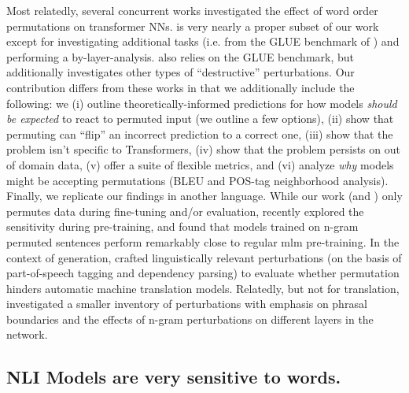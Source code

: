 \documentclass[letterpaper, 12pt]{report}
\begin{document}
Most relatedly, several concurrent works \citep{pham-etal-2020-out, alleman2021syntactic, gupta-etal-2021-bert, sinha2021masked,parthasarathi2021sometimes} investigated the effect of word order permutations on transformer NNs.  \cite{pham-etal-2020-out} is very nearly a proper subset of our work except for investigating additional tasks (i.e. from the GLUE benchmark of \citealt{wang-etal-2018-glue}) and performing a by-layer-analysis. \cite{gupta-etal-2021-bert} also relies on the GLUE benchmark, but additionally investigates other types of ``destructive'' perturbations. Our contribution differs from these works %
in that we additionally include the following: we (i) outline theoretically-informed predictions for how models \emph{should be expected} to react to permuted input (we outline a few options), (ii) show that permuting can ``flip'' an incorrect prediction to a correct one, (iii) show that the problem isn't specific to Transformers, (iv) show that the problem persists on out of domain data, (v) offer a suite of flexible metrics, and (vi) analyze \emph{why} models might be accepting permutations (BLEU and POS-tag neighborhood analysis). Finally, we replicate our findings in another language.
While our work (and \citeauthor{pham-etal-2020-out,gupta-etal-2021-bert}) only permutes data during fine-tuning and/or evaluation,
recently \citeauthor{sinha2021masked} explored the sensitivity during pre-training, and found that models trained on n-gram permuted sentences perform remarkably close to regular \acrshort{mlm} pre-training.
In the context of generation, \cite{parthasarathi2021sometimes} crafted linguistically relevant perturbations (on the basis of part-of-speech tagging and dependency parsing) to evaluate whether permutation hinders automatic machine translation models. Relatedly, but not for translation, \cite{alleman2021syntactic} investigated a smaller inventory of perturbations with emphasis on phrasal boundaries and the effects of n-gram perturbations on different layers in the network. %


\subsection{NLI Models are very sensitive to words.}
\end{document}
